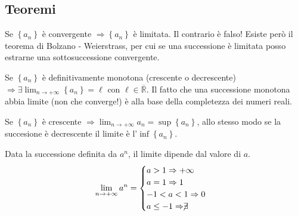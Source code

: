\documentclass[12pt,a4paper]{article}
\begin{document}
\subsection{Teoremi}
Se $ {\left\{ a_n \right\}} $ \`e convergente $ \Rightarrow 
{\left\{ a_n \right\}} $ \`e limitata. Il contrario \`e falso! 
Esiste per\`o il teorema di Bolzano - Weierstrass, per cui se
una successione \`e limitata posso estrarne una sottosuccessione convergente.

Se $ {\left\{ a_n \right\}} $ \`e definitivamente monotona (crescente o 
decrescente) $ \Rightarrow \exists \lim_{n \to +\infty} {\left\{ a_n \right\}}
= \ell$ con $\ell \in \overline{\mathbb{R}}$. Il fatto che una successione
monotona abbia limite (non che converge!) \`e alla base della completezza dei
numeri reali.

Se $ {\left\{ a_n \right\}} $ \`e crescente $ \Rightarrow \lim_{n \to +\infty}
a_n = \sup {\left\{ a_n \right\}}$, allo stesso modo se la succesione \`e
decrescente il limite \`e l'$\inf {\left\{ a_n \right\}}$.

Data la successione definita da $a^n$, il limite dipende dal valore di $a$.
$$
\lim_{n \to +\infty} a^n = \begin{cases}
a > 1 \Rightarrow +\infty \\
a = 1 \Rightarrow 1 \\
-1 < a < 1 \Rightarrow 0 \\
a \leq -1 \Rightarrow \centernot{\exists}
\end{cases}
$$
\end{document}
